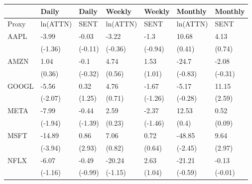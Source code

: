 \begin{tabular}{lllllll}
\toprule
{} &     Daily &    Daily &    Weekly &   Weekly &   Monthly &  Monthly \\
\midrule
Proxy &  ln(ATTN) &     SENT &  ln(ATTN) &     SENT &  ln(ATTN) &     SENT \\
AAPL  &     -3.99 &    -0.03 &     -3.22 &     -1.3 &     10.68 &     4.13 \\
      &   (-1.36) &  (-0.11) &   (-0.36) &  (-0.94) &    (0.41) &   (0.74) \\
AMZN  &      1.04 &     -0.1 &      4.74 &     1.53 &     -24.7 &    -2.08 \\
      &    (0.36) &  (-0.32) &    (0.56) &   (1.01) &   (-0.83) &  (-0.31) \\
GOOGL &     -5.56 &     0.32 &      4.76 &    -1.67 &     -5.17 &    11.15 \\
      &   (-2.07) &   (1.25) &    (0.71) &  (-1.26) &   (-0.28) &   (2.59) \\
META  &     -7.99 &    -0.44 &      2.59 &    -2.37 &     12.53 &     0.52 \\
      &   (-1.94) &  (-1.39) &    (0.23) &  (-1.46) &     (0.4) &   (0.09) \\
MSFT  &    -14.89 &     0.86 &      7.06 &     0.72 &    -48.85 &     9.64 \\
      &   (-3.94) &   (2.93) &    (0.82) &   (0.64) &   (-2.45) &   (2.97) \\
NFLX  &     -6.07 &    -0.49 &    -20.24 &     2.63 &    -21.21 &    -0.13 \\
      &   (-1.16) &  (-0.99) &   (-1.15) &   (1.04) &   (-0.59) &  (-0.01) \\
\bottomrule
\end{tabular}

